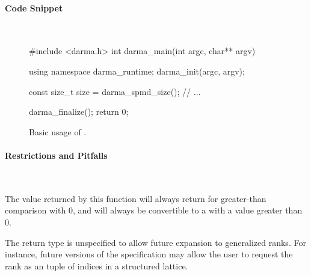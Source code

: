 \paragraph{Code Snippet} \mbox{}\\
\begin{figure}[!h]
\begin{CppCodeNumb}
#include <darma.h>
int darma_main(int argc, char** argv)
{
  using namespace darma_runtime;
  darma_init(argc, argv);

  const size_t size = darma_spmd_size();
  // ...

  darma_finalize();
  return 0;
}
\end{CppCodeNumb}
\label{fig:fe_api_ranksize}
  \caption{Basic usage of \protect{}.}
\end{figure}

\paragraph{Restrictions and Pitfalls}\mbox{} \\
\begin{compactitem}
  \item The value returned by this function will always return 
  for greater-than comparison with 0, and will always be convertible to a
     with a value greater than 0.
  \item The return type is unspecified to allow future expansion to generalized
    \glspl{rank}.  For instance, future versions of the specification may allow the user to
    request the \gls{rank} as an  \gls{tuple} of indices in a structured
  lattice.
\end{compactitem}

